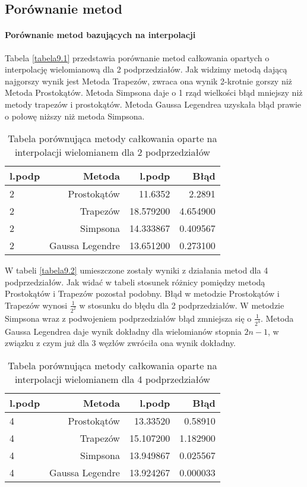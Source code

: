 \documentclass[12pt,twoside]{article}
\begin{document}
\clearpage

\subsection{Porównanie metod}

\paragraph{Porównanie metod bazujących na interpolacji}\mbox{}

Tabela \eqref{tabela9.1} przedstawia porównanie metod całkowania opartych o interpolację wielomianową dla 2 podprzedziałów.
Jak widzimy metodą dającą najgorszy wynik jest Metoda Trapezów, zwraca ona wynik 2-krotnie gorszy niż Metoda Prostokątów. 
Metoda Simpsona daje o 1 rząd wielkości błąd mniejszy niż metody trapezów i prostokątów. 
Metoda Gaussa Legendrea uzyskała błąd prawie o połowę niższy niż metoda Simpsona.

\begin{table}[h]
\centering 
\caption{Tabela porównująca metody całkowania oparte na interpolacji wielomianem dla 2 podprzedziałów }
\label{tabela9.1}
\begin{tabular}{lrrr}
\toprule
{l.podp} & Metoda &  l.podp &  Błąd \\
\midrule
2  &     Prostokątów & 11.6352 &   2.2891  \\
2  &     Trapezów & 18.579200 &  4.654900  \\
2  &     Simpsona & 14.333867 &   0.409567  \\
2  &     Gaussa Legendre & 13.651200 &  0.273100  \\
\bottomrule
\end{tabular}
\end{table}


W tabeli \eqref{tabela9.2} umieszczone zostały wyniki z działania metod dla 4 podprzedziałów.
Jak widać w tabeli stosunek różnicy pomiędzy metodą Prostokątów i Trapezów pozostał podobny.
Błąd w metodzie Prostokątów i Trapezów wynosi $\frac{1}{2^2}$ w stosunku do błędu dla 2 podprzedziałów.
W metodzie Simpsona wraz z podwojeniem podprzedziałów błąd zmniejsza się o $\frac{1}{2^4}$.
Metoda Gaussa Legendrea daje wynik dokładny dla wielomianów stopnia $2n-1$, w związku z czym już dla 3 węzłów zwróciła ona wynik dokładny.


\begin{table}[h]
\centering 
\caption{Tabela porównująca metody całkowania oparte na interpolacji wielomianem dla 4 podprzedziałów }\mbox{}
\label{tabela9.2}
\begin{tabular}{lrrr}
\toprule
{l.podp} & Metoda &  l.podp &  Błąd \\
\midrule
4  &     Prostokątów & 13.33520 &   0.58910  \\
4  &     Trapezów & 15.107200 &  1.182900  \\
4  &     Simpsona & 13.949867 &   0.025567  \\
4  &     Gaussa Legendre & 13.924267 &  0.000033  \\
\bottomrule
\end{tabular}
\end{table}
\end{document}
